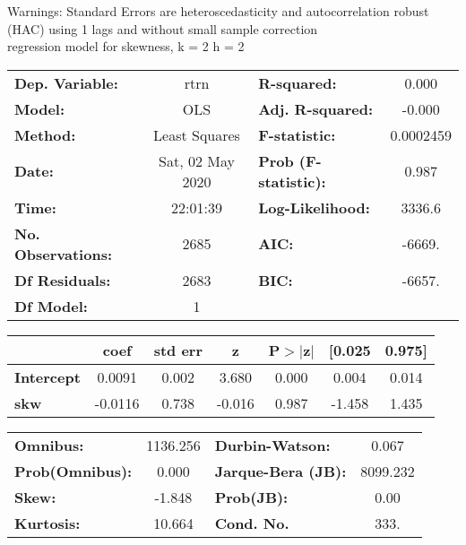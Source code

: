 Warnings: \newline
 [1] Standard Errors are heteroscedasticity and autocorrelation robust (HAC) using 1 lags and without small sample correction\\ 

regression model for skewness, k = 2 h = 2\begin{center}
\begin{tabular}{lclc}
\toprule
\textbf{Dep. Variable:}    &       rtrn       & \textbf{  R-squared:         } &     0.000   \\
\textbf{Model:}            &       OLS        & \textbf{  Adj. R-squared:    } &    -0.000   \\
\textbf{Method:}           &  Least Squares   & \textbf{  F-statistic:       } & 0.0002459   \\
\textbf{Date:}             & Sat, 02 May 2020 & \textbf{  Prob (F-statistic):} &    0.987    \\
\textbf{Time:}             &     22:01:39     & \textbf{  Log-Likelihood:    } &    3336.6   \\
\textbf{No. Observations:} &        2685      & \textbf{  AIC:               } &    -6669.   \\
\textbf{Df Residuals:}     &        2683      & \textbf{  BIC:               } &    -6657.   \\
\textbf{Df Model:}         &           1      & \textbf{                     } &             \\
\bottomrule
\end{tabular}
\begin{tabular}{lcccccc}
                   & \textbf{coef} & \textbf{std err} & \textbf{z} & \textbf{P$> |$z$|$} & \textbf{[0.025} & \textbf{0.975]}  \\
\midrule
\textbf{Intercept} &       0.0091  &        0.002     &     3.680  &         0.000        &        0.004    &        0.014     \\
\textbf{skw}       &      -0.0116  &        0.738     &    -0.016  &         0.987        &       -1.458    &        1.435     \\
\bottomrule
\end{tabular}
\begin{tabular}{lclc}
\textbf{Omnibus:}       & 1136.256 & \textbf{  Durbin-Watson:     } &    0.067  \\
\textbf{Prob(Omnibus):} &   0.000  & \textbf{  Jarque-Bera (JB):  } & 8099.232  \\
\textbf{Skew:}          &  -1.848  & \textbf{  Prob(JB):          } &     0.00  \\
\textbf{Kurtosis:}      &  10.664  & \textbf{  Cond. No.          } &     333.  \\
\bottomrule
\end{tabular}
\end{center}

